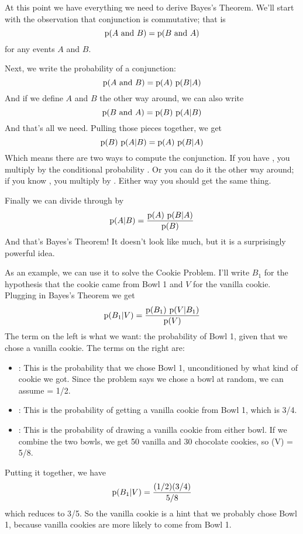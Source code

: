 \documentclass[12pt]{book}
\begin{document}
At this point we have everything we need to derive Bayes's Theorem.
We'll start with the observation that conjunction is commutative; that is
%
\[ \mathrm{p}(A ~\mathrm{and}~ B) = \mathrm{p}(B ~\mathrm{and}~ A) \]
%
for any events $A$ and $B$.

Next, we write the probability of a conjunction:
%
\[ \mathrm{p}(A ~\mathrm{and}~ B) = \mathrm{p}(A)~\mathrm{p}(B|A) \]
%
And if we define $A$ and $B$ the other way
around, we can also write
%
\[ \mathrm{p}(B ~\mathrm{and}~ A) = \mathrm{p}(B)~\mathrm{p}(A|B) \]
%
And that's all we need.  Pulling those pieces together, we get
%
\[ \mathrm{p}(B)~\mathrm{p}(A|B) = \mathrm{p}(A)~\mathrm{p}(B|A) \]
%
Which means there are two ways to compute the conjunction.
If you have , you multiply by the conditional
probability .  Or you can do it the other way around; if you
know , you multiply by .  Either way you should get
the same thing.

Finally we can divide through by 
%
\[ \mathrm{p}(A|B) = \frac{\mathrm{p}(A)~\mathrm{p}(B|A)}{\mathrm{p}(B)} \]
%
And that's Bayes's Theorem!  It doesn't look like much, but
it is a surprisingly powerful idea.

As an example, we can use it to solve the Cookie Problem.  I'll write
$B_1$ for the hypothesis that the cookie came from Bowl 1
and $V$ for the vanilla cookie.  Plugging in Bayes's Theorem
we get
%
\[ \mathrm{p}(B_1|V) = \frac{\mathrm{p}(B_1)~\mathrm{p}(V|B_1)}{\mathrm{p}(V)} \]
%
The term on the left is what we want: the probability of Bowl 1, given
that we chose a vanilla cookie.  The terms on the right are:

\begin{itemize}

\item {}: This is the probability that we chose Bowl 1, unconditioned
by what kind of cookie we got.  Since the problem says we chose a
bowl at random, we can assume  = 1/2.

\item {}: This is the probability of getting a vanilla cookie
from Bowl 1, which is 3/4.

\item {}: This is the probability of drawing a vanilla cookie from
either bowl.  If we combine the two bowls, we get 50 vanilla and 30
chocolate cookies, so \p(V) = 5/8.

\end{itemize}

Putting it together, we have 
%
\[ \mathrm{p}(B_1|V) = \frac{(1/2)(3/4)}{5/8} \]
%
which reduces to 3/5.  So the vanilla cookie is a hint that
we probably chose Bowl 1, because vanilla cookies are more likely to
come from Bowl 1.
\end{document}
